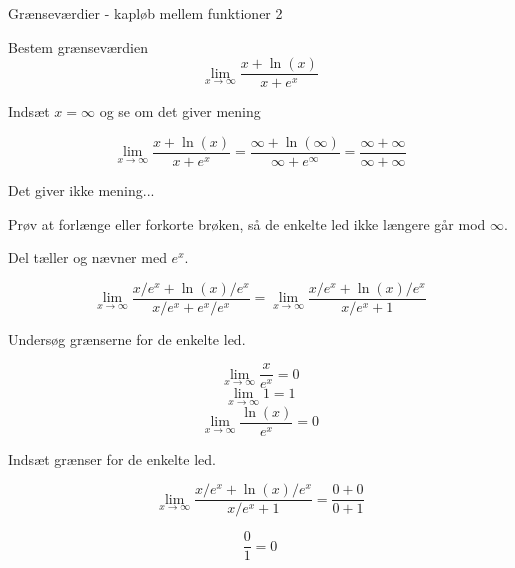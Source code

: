 \documentclass{article}
\begin{document}
\begin{exercise}{Grænseværdier - kapløb mellem funktioner 2}
	
	Bestem grænseværdien 
	\[
	\lim_{x \to \infty} \frac{x + \ln(x)}{x + e^x}
	\]
	
	
	\hint
	Indsæt $x=\infty$ og se om det giver mening
	
	\hint
	\[
	\lim_{x \to \infty} \frac{x + \ln(x)}{x + e^x} = \frac{\infty + \ln(\infty)}{\infty + e^\infty} = \frac{\infty + \infty}{\infty + \infty}
	\]
	
	\hint
	Det giver ikke mening...
	
	\hint
	Prøv at forlænge eller forkorte brøken, så de enkelte led ikke længere går mod $\infty$. 
	
	\hint
	Del tæller og nævner med $e^x$. 
	
	\hint
	\[
	\lim_{x \to \infty} \frac{x/e^x + \ln(x)/e^x}{x/e^x + e^x/e^x} = \lim_{x \to \infty} \frac{x/e^x + \ln(x)/e^x}{x/e^x + 1}
	\]
	
	\hint
	Undersøg grænserne for de enkelte led.
	
	\hint
	\[
	\lim_{x \to \infty} \frac{x}{e^x} = 0
	\]
	\[
	\lim_{x \to \infty} 1 = 1
	\]
	\[
	\lim_{x \to \infty} \frac{\ln(x)}{e^x} = 0
	\]
	
	\hint 
	Indsæt grænser for de enkelte led.
	
	\hint
	\[
	\lim_{x \to \infty} \frac{x/e^x + \ln(x)/e^x}{x/e^x + 1} = \frac{0 + 0}{0+1}
	\]
	
	\hint
	\[
	\frac{0}{1} = 0
	\]
	
\end{exercise}
\newpage
\end{document}
